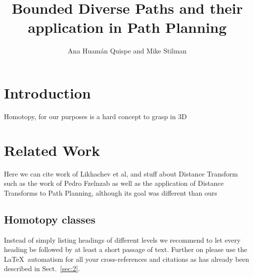 \documentclass[graybox]{svmult}
\begin{document}
\title*{Bounded Diverse Paths and their application in Path Planning}
\author{Ana Huam\'an Quispe and Mike Stilman}

\maketitle



\section{Introduction}
\label{sec:Introduction}
Homotopy, for our purposes is a hard concept to grasp in 3D

\section{Related Work}
\label{sec:RelatedWork}
Here we can cite work of Likhachev et al, and stuff about Distance Transform such as the work of Pedro Fzelnzab as well as the application of Distance Transforms to Path Planning, although its goal was different than ours

\subsection{Homotopy classes}

\label{subsec:HomotopyClasses}
Instead of simply listing headings of different levels we recommend to
let every heading be followed by at least a short passage of text.
Further on please use the \LaTeX\ automatism for all your
cross-references and citations
as has already been described in Sect.~\ref{sec:2}.
\end{document}
